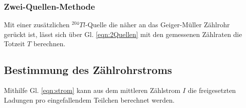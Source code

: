 \subsubsection*{Zwei-Quellen-Methode}
Mit einer zusätzlichen $^{204}Tl$-Quelle die näher an das Geiger-Müller Zählrohr gerückt ist,
lässt sich über Gl. \ref{eqn:2Quellen} mit den gemessenen Zählraten die Totzeit $T$ berechnen.
\subsection{Bestimmung des Zählrohrstroms}
Mithilfe Gl. \ref{eqn:strom} kann aus dem mittleren Zählstrom $I$
die freigesetzten Ladungen pro eingefallendem Teilchen berechnet werden. 
\label{sec:Durchfuehrung}
